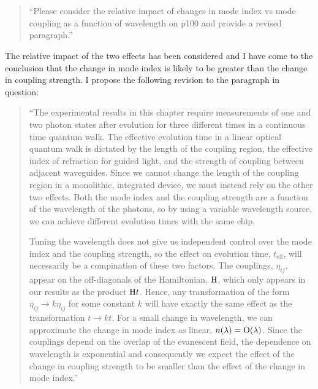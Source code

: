 \documentclass[a4paper,11pt]{article}
\begin{document}
\section{}
\begin{quote}
  ``Please consider the relative impact of changes in mode index vs
  mode coupling as a function of wavelength on p100 and provide a
  revised paragraph.''
\end{quote}
The relative impact of the two effects has been considered and I have come to
the conclusion that the change in mode index is likely to be greater than the
change in coupling strength. I propose the following revision to the paragraph
in question:
\begin{quote}
  ``The experimental results in this chapter require measurements of one and two
  photon states after evolution for three different times in a continuous time
  quantum walk. The effective evolution time in a linear optical quantum walk is
  dictated by the length of the coupling region, the effective index of
  refraction for guided light, and the strength of coupling between adjacent
  waveguides. Since we cannot change the length of the coupling region in a
  monolithic, integrated device, we must instead rely on the other two effects.
  Both the mode index and the coupling strength are a function of the wavelength
  of the photons, so by using a variable wavelength source, we can achieve
  different evolution times with the same chip.

  Tuning the wavelength does not give us independent control over the mode index
  and the coupling strength, so the effect on evolution time,
  \(t_{\text{eff}}\), will necessarily be a compination of these two factors.
  The couplings, \(\eta_{ij}\), appear on the off-diagonals of the Hamiltonian,
  \(\mathrm{H}\), which only appears in our results as the product \(\mathrm{H} t\).
  Hence, any transformation of the form \(\eta_{ij} \rightarrow k \eta_{ij}\)
  for some constant \(k\) will have exactly the same effect as the
  transformation \(t \rightarrow k t\). For a small change in wavelength, we
  can approximate the change in mode index as linear, \(n \!\left(\lambda\right) = \mathrm{O}
  \!\left(\lambda\right)\). Since the couplings depend on the overlap of the evanescent
  field, the dependence on wavelength is exponential and consequently we expect
  the effect of the change in coupling strength to be smaller than the effect of
  the change in mode index.''
\end{quote}
\end{document}
